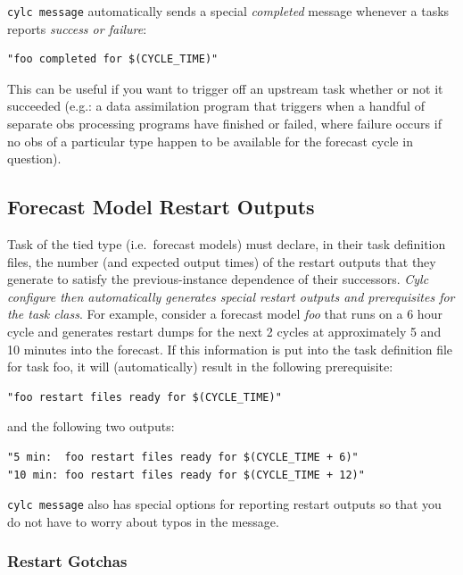 \documentclass[11pt,a4paper]{article}
\begin{document}
\lstinline=cylc message= automatically sends a special {\em completed}
message whenever a tasks reports {\em success or failure}:
\begin{lstlisting}
"foo completed for $(CYCLE_TIME)"
\end{lstlisting}
 
This can be useful if you want to trigger off an upstream task whether
or not it succeeded (e.g.: a data assimilation program that triggers
when a handful of separate obs processing programs have finished or
failed, where failure occurs if no obs of a particular type happen to be
available for the forecast cycle in question).


\subsection{Forecast Model Restart Outputs}

Task of the tied type (i.e.\ forecast models) must declare, in their
task definition files, the number (and expected output times) of
the restart outputs that they generate to satisfy the previous-instance
dependence of their successors. {\em Cylc configure then automatically
generates special restart outputs and prerequisites for the task class}.
For example, consider a forecast model {\em foo} that runs on a
6 hour cycle and generates restart dumps for the next 2 cycles at
approximately 5 and 10 minutes into the forecast. If this information 
is put into the task definition file for task foo, it will
(automatically) result in the following prerequisite:

\begin{lstlisting}
"foo restart files ready for $(CYCLE_TIME)"
\end{lstlisting}

and the following two outputs:

\begin{lstlisting}
"5 min:  foo restart files ready for $(CYCLE_TIME + 6)"
"10 min: foo restart files ready for $(CYCLE_TIME + 12)"
\end{lstlisting}

\lstinline=cylc message= also has special options for reporting restart
outputs so that you do not have to worry about typos in the message. 

\subsubsection{Restart Gotchas}
\end{document}
